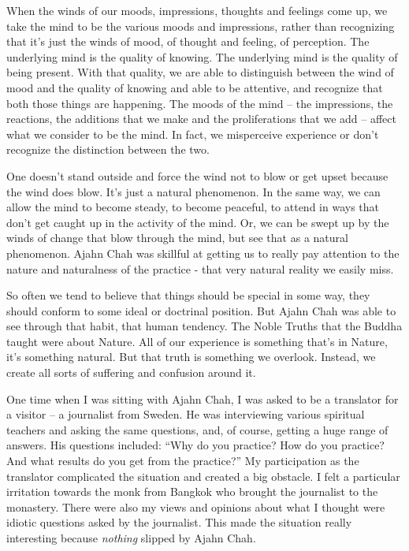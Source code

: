 When the winds of our moods, impressions, thoughts and feelings come up, 
we take the mind to be the various moods and impressions, rather than
recognizing that it's just the winds of mood, of thought and feeling, of
perception. The underlying mind is the quality of knowing. The
underlying mind is the quality of being present. With that quality, we
are able to distinguish between the wind of mood and the quality of
knowing and able to be attentive, and recognize that both those things
are happening. The moods of the mind -- the impressions, the reactions, 
the additions that we make and the proliferations that we add -- affect
what we consider to be the mind. In fact, we misperceive experience or
don't recognize the distinction between the two. 

One doesn't stand outside and force the wind not to blow or get upset
because the wind does blow. It's just a natural phenomenon. In the same
way, we can allow the mind to become steady, to become peaceful, to
attend in ways that don't get caught up in the activity of the mind. Or, 
we can be swept up by the winds of change that blow through the mind, 
but see that as a natural phenomenon. Ajahn Chah was skillful at getting
us to really pay attention to the nature and naturalness of the practice
- that very natural reality we easily miss. 

So often we tend to believe that things should be special in some way, 
they should conform to some ideal or doctrinal position. But Ajahn Chah
was able to see through that habit, that human tendency. The Noble
Truths that the Buddha taught were about Nature. All of our experience
is something that's in Nature, it's something natural. But that truth is
something we overlook. Instead, we create all sorts of suffering and
confusion around it. 

One time when I was sitting with Ajahn Chah, I was asked to be a
translator for a visitor -- a journalist from Sweden. He was
interviewing various spiritual teachers and asking the same questions, 
and, of course, getting a huge range of answers. His questions included: 
``Why do you practice? How do you practice?  And what results do you get
from the practice?'' My participation as the translator complicated the
situation and created a big obstacle. I felt a particular irritation
towards the monk from Bangkok who brought the journalist to the
monastery. There were also my views and opinions about what I thought
were idiotic questions asked by the journalist. This made the situation
really interesting because \emph{nothing} slipped by Ajahn Chah. 


